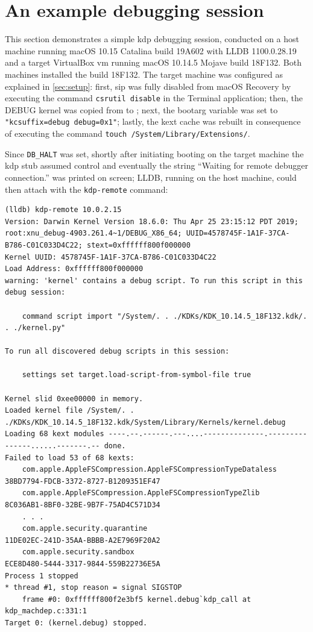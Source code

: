 \section{An example debugging session}\label{sec:dbgsession}
This section demonstrates a simple \gls{kdp} debugging session, conducted on a host machine running macOS 10.15 Catalina build 19A602 with LLDB 1100.0.28.19 and a target VirtualBox \gls{vm} running macOS 10.14.5 Mojave build 18F132. Both machines installed the  build 18F132. The target machine was configured as explained in \cref{sec:setup}: first, \gls{sip} was fully disabled from macOS Recovery by executing the command \lstinline{csrutil disable} in the Terminal application; then, the DEBUG kernel was copied from  to ; next, the \gls{bootarg} variable was set to \lstinline{"kcsuffix=debug debug=0x1"}; lastly, the \gls{kext} cache was rebuilt in consequence of executing the command \lstinline{touch /System/Library/Extensions/}.

Since \lstinline{DB_HALT} was set, shortly after initiating booting on the target machine the \gls{kdp} stub assumed control and eventually the string \enquote{Waiting for remote debugger connection.} was printed on screen; LLDB, running on the host machine, could then attach with the \lstinline{kdp-remote} command:
\begin{lstlisting}[style=lldbsession,label={lst:kdpremote}]
(lldb) kdp-remote 10.0.2.15
Version: Darwin Kernel Version 18.6.0: Thu Apr 25 23:15:12 PDT 2019; root:xnu_debug-4903.261.4~1/DEBUG_X86_64; UUID=4578745F-1A1F-37CA-B786-C01C033D4C22; stext=0xffffff800f000000
Kernel UUID: 4578745F-1A1F-37CA-B786-C01C033D4C22
Load Address: 0xffffff800f000000
warning: 'kernel' contains a debug script. To run this script in this debug session:

    command script import "/System/. . ./KDKs/KDK_10.14.5_18F132.kdk/. . ./kernel.py"

To run all discovered debug scripts in this session:

    settings set target.load-script-from-symbol-file true

Kernel slid 0xee00000 in memory.
Loaded kernel file /System/. . ./KDKs/KDK_10.14.5_18F132.kdk/System/Library/Kernels/kernel.debug
Loading 68 kext modules ----.--.------.---....--------------.---------------......-------.-- done.
Failed to load 53 of 68 kexts:
    com.apple.AppleFSCompression.AppleFSCompressionTypeDataless 38BD7794-FDCB-3372-8727-B1209351EF47
    com.apple.AppleFSCompression.AppleFSCompressionTypeZlib     8C036AB1-8BF0-32BE-9B7F-75AD4C571D34
    . . .
    com.apple.security.quarantine                               11DE02EC-241D-35AA-BBBB-A2E7969F20A2
    com.apple.security.sandbox                                  ECE8D480-5444-3317-9844-559B22736E5A
Process 1 stopped
* thread #1, stop reason = signal SIGSTOP
    frame #0: 0xffffff800f2e3bf5 kernel.debug`kdp_call at kdp_machdep.c:331:1
Target 0: (kernel.debug) stopped.
\end{lstlisting}

